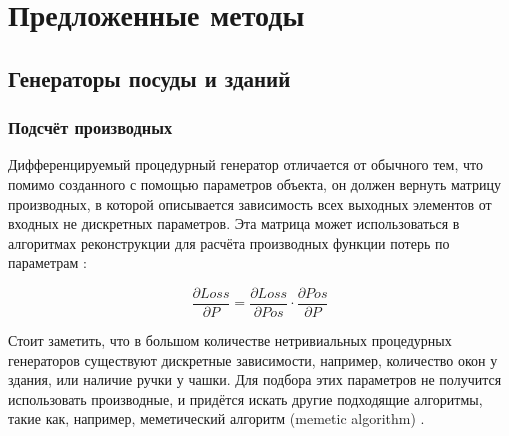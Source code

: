 \documentclass[a4paper,hidelinks,12pt]{article}
\begin{document}
\section{Предложенные методы}
\subsection{Генераторы посуды и зданий}
\subsubsection{Подсчёт производных}
Дифференцируемый процедурный генератор отличается от обычного тем, что помимо созданного с помощью параметров объекта, он должен вернуть матрицу производных, в которой описывается зависимость всех выходных элементов от входных не дискретных параметров. Эта матрица может использоваться в алгоритмах реконструкции для расчёта производных функции потерь по параметрам \cite{garifullin2023diff} \cite{garifullin2024single}:
\par
$$\frac{\partial Loss} {\partial P} = \frac{\partial Loss} {\partial Pos} \cdot \frac{\partial Pos} {\partial P}$$
\par
Стоит заметить, что в большом количестве нетривиальных процедурных генераторов существуют дискретные зависимости, например, количество окон у здания, или наличие ручки у чашки. Для подбора этих параметров не получится использовать производные, и придётся искать другие подходящие алгоритмы, такие как, например, меметический алгоритм (memetic algorithm) \cite{garifullin2023diff} \cite{garifullin2024single}.
\end{document}
